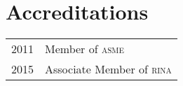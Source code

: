\section*{Accreditations} %
\label{sec:ce}

\begin{tabular}{l l}
2011 & Member of \textsc{asme} \\
2015 & Associate Member of \textsc{rina} \\
\end{tabular}


